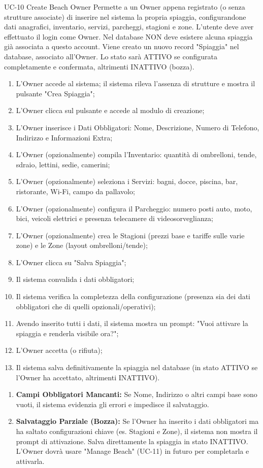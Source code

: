 \usecasetable
{UC-10}
{Create Beach}
{Owner}
{Permette a un Owner appena registrato (o senza strutture associate) di inserire nel sistema la propria spiaggia, configurandone dati anagrafici, inventario, servizi, parcheggi, stagioni e zone.}
{L'utente deve aver effettuato il login come Owner. Nel database NON deve esistere alcuna spiaggia già associata a questo account.}
{Viene creato un nuovo record "Spiaggia" nel database, associato all'Owner. Lo stato sarà ATTIVO se configurata completamente e confermata, altrimenti INATTIVO (bozza).}
{
	\begin{enumerate}[nosep, leftmargin=15px]
		\item L'Owner accede al sistema; il sistema rileva l'assenza di strutture e mostra il pulsante "Crea Spiaggia";
		\item L'Owner clicca sul pulsante e accede al modulo di creazione;
		\item L'Owner inserisce i Dati Obbligatori: Nome, Descrizione, Numero di Telefono, Indirizzo e Informazioni Extra;
		\item L'Owner (opzionalmente) compila l'Inventario: quantità di ombrelloni, tende, sdraio, lettini, sedie, camerini;
		\item L'Owner (opzionalmente) seleziona i Servizi: bagni, docce, piscina, bar, ristorante, Wi-Fi, campo da pallavolo;
		\item L'Owner (opzionalmente) configura il Parcheggio: numero posti auto, moto, bici, veicoli elettrici e presenza telecamere di videosorveglianza;
		\item L'Owner (opzionalmente) crea le Stagioni (prezzi base e tariffe sulle varie zone) e le Zone (layout ombrelloni/tende);
		\item L'Owner clicca su "Salva Spiaggia";
		\item Il sistema convalida i dati obbligatori;
		\item Il sistema verifica la completezza della configurazione (presenza sia dei dati obbligatori che di quelli opzionali/operativi);
		\item Avendo inserito tutti i dati, il sistema mostra un prompt: "Vuoi attivare la spiaggia e renderla visibile ora?";
		\item L'Owner accetta (o rifiuta);
		\item Il sistema salva definitivamente la spiaggia nel database (in stato ATTIVO se l'Owner ha accettato, altrimenti INATTIVO).
	\end{enumerate}
}
{
	\begin{enumerate}[nosep, leftmargin=25px]
		\item[\textbf{9a-e.}] \textbf{Campi Obbligatori Mancanti:} Se Nome, Indirizzo o altri campi base sono vuoti, il sistema evidenzia gli errori e impedisce il salvataggio.
		\item[\textbf{10a.}] \textbf{Salvataggio Parziale (Bozza):} Se l'Owner ha inserito i dati obbligatori ma ha saltato configurazioni chiave (es. Stagioni e Zone), il sistema non mostra il prompt di attivazione. Salva direttamente la spiaggia in stato INATTIVO. L'Owner dovrà usare "Manage Beach" (UC-11) in futuro per completarla e attivarla.
	\end{enumerate}
}
